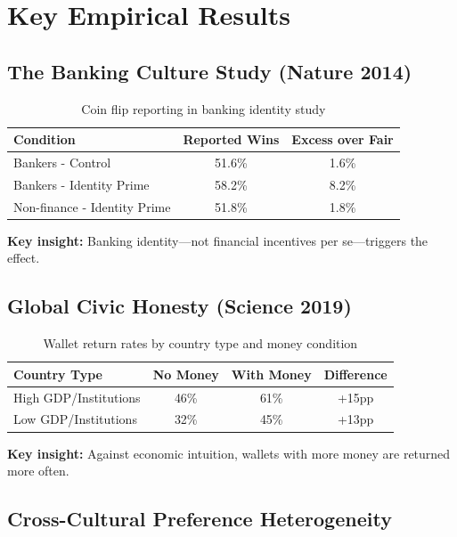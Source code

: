 \section{Key Empirical Results}

\subsection{The Banking Culture Study (Nature 2014)}

\begin{table}[h]
\centering
\begin{tabular}{lcc}
\hline
\textbf{Condition} & \textbf{Reported Wins} & \textbf{Excess over Fair} \\
\hline
Bankers - Control & 51.6\% & 1.6\% \\
Bankers - Identity Prime & 58.2\% & 8.2\% \\
Non-finance - Identity Prime & 51.8\% & 1.8\% \\
\hline
\end{tabular}
\caption{Coin flip reporting in banking identity study}
\end{table}

\textbf{Key insight:} Banking identity---not financial incentives per se---triggers the effect.

\subsection{Global Civic Honesty (Science 2019)}

\begin{table}[h]
\centering
\begin{tabular}{lccc}
\hline
\textbf{Country Type} & \textbf{No Money} & \textbf{With Money} & \textbf{Difference} \\
\hline
High GDP/Institutions & 46\% & 61\% & +15pp \\
Low GDP/Institutions & 32\% & 45\% & +13pp \\
\hline
\end{tabular}
\caption{Wallet return rates by country type and money condition}
\end{table}

\textbf{Key insight:} Against economic intuition, wallets with more money are returned more often.

\subsection{Cross-Cultural Preference Heterogeneity}

